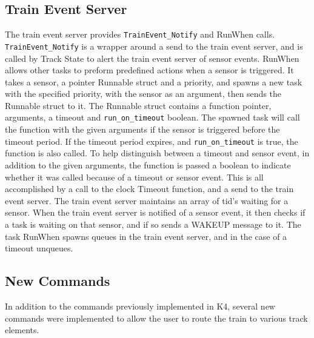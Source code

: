 \documentclass{article}
\begin{document}
\subsection{ Train Event Server}
The train event server provides \verb|TrainEvent_Notify| and RunWhen calls. \verb|TrainEvent_Notify| is a wrapper around a send to the train event server, and is called by Track State to alert the train event server of sensor events. RunWhen allows other tasks to preform predefined actions when a sensor is triggered. It takes a sensor, a pointer Runnable struct and a priority, and spawns a new task with the specified priority, with the sensor as an argument, then sends the Runnable struct to it. The Runnable struct contains a function pointer, arguments, a timeout and \verb|run_on_timeout| boolean.
The spawned task will call the function with the given arguments if the sensor is triggered before the timeout period. If the timeout period expires, and \verb|run_on_timeout| is true, the function is also called. To help distinguish between a timeout and sensor event, in addition to the given arguments, the function is passed a boolean to indicate whether it was called because of a timeout or sensor event.
This is all accomplished by a call to the clock Timeout function, and a send to the train event server. The train event server maintains an array of tid's waiting for a sensor. When the train event server is notified of a sensor event, it then checks if a task is waiting on that sensor, and if so sends a WAKEUP message to it. The task RunWhen spawns queues in the train event server, and in the case of a timeout unqueues. 

\subsection{New Commands}
In addition to the commands previously implemented in K4, several new commands were implemented to allow the user to route the train to various track elements.
\end{document}

